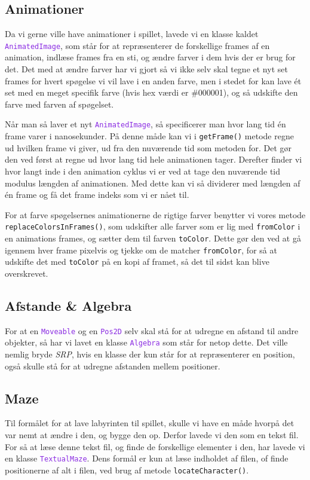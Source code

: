 \documentclass{article}
\newcommand{\code}[1]{\small\texttt{#1}}
\newcommand{\class}[1]{\textcolor{BlueViolet}{\small\texttt{#1}}}
\theoremstyle{mytheoremstyle}
\theoremstyle{mytheoremstyle}
\theoremstyle{myproblemstyle}
\begin{document}

\subsection{Animationer}\label{sub:Animationer} %
Da vi gerne ville have animationer i spillet, lavede vi en klasse kaldet
\class{AnimatedImage}, som står for at repræsenterer de forskellige frames af en
animation, indlæse frames fra en sti, og ændre farver i dem hvis der er brug for
det. Det med at ændre farver har vi gjort så vi ikke selv skal tegne et nyt set
frames for hvert spøgelse vi vil lave i en anden farve, men i stedet for kan
lave ét set med en meget specifik farve (hvis hex værdi er \#000001), og så
udskifte den farve med farven af spøgelset.

Når man så laver et nyt \class{AnimatedImage}, så specificerer man hvor lang tid
én frame varer i nanosekunder. På denne måde kan vi i \code{getFrame()} metode
regne ud hvilken frame vi giver, ud fra den nuværende tid som metoden for. Det
gør den ved først at regne ud hvor lang tid hele animationen tager. Derefter
finder vi hvor langt inde i den animation cyklus vi er ved at tage den
nuværende tid modulus længden af animationen. Med dette kan vi så dividerer med
længden af én frame og få det frame indeks som vi er nået til.

For at farve spøgelsernes animationerne de rigtige farver benytter vi vores
metode \code{replaceColorsInFrames()}, som udskifter alle farver som er lig med
\code{fromColor} i en animations frames, og sætter dem til farven
\code{toColor}. Dette gør den ved at gå igennem hver frame pixelvis og tjekke om
de matcher \code{fromColor}, for så at udskifte det med \code{toColor} på en
kopi af framet, så det til sidst kan blive overskrevet.

\subsection{Afstande \& Algebra}
For at en \class{Moveable} og en \class{Pos2D} selv skal stå for at udregne en
afstand til andre objekter, så har vi lavet en klasse \class{Algebra} som står
for netop dette. Det ville nemlig bryde \textit{SRP}, hvis en klasse der kun
står for at repræsenterer en position, også skulle stå for at udregne afstanden
mellem positioner.

\subsection{Maze}
Til formålet for at lave labyrinten til spillet, skulle vi have en måde hvorpå
det var nemt at ændre i den, og bygge den op. Derfor lavede vi den som en tekst
fil. For så at læse denne tekst fil, og finde de forskellige elementer i den,
har lavede vi en klasse \class{TextualMaze}. Dens formål er kun at læse indholdet
af filen, of finde positionerne af alt i filen, ved brug af metode
\code{locateCharacter()}.
\end{document}
